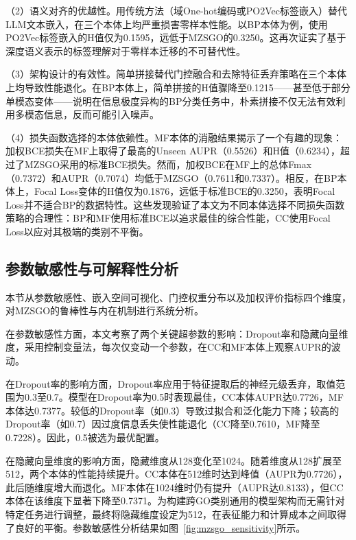 （2）语义对齐的优越性。用传统方法（域One-hot编码或PO2Vec标签嵌入）替代LLM文本嵌入，在三个本体上均严重损害零样本性能。以BP本体为例，使用PO2Vec标签嵌入的H值仅为0.1595，远低于MZSGO的0.3250。这再次证实了基于深度语义表示的标签理解对于零样本迁移的不可替代性。

（3）架构设计的有效性。简单拼接替代门控融合和去除特征丢弃策略在三个本体上均导致性能退化。在BP本体上，简单拼接的H值骤降至0.1215——甚至低于部分单模态变体——说明在信息极度异构的BP分类任务中，朴素拼接不仅无法有效利用多模态信息，反而可能引入噪声。

（4）损失函数选择的本体依赖性。MF本体的消融结果揭示了一个有趣的现象：加权BCE损失在MF上取得了最高的Unseen AUPR（0.5526）和H值（0.6234），超过了MZSGO采用的标准BCE损失。然而，加权BCE在MF上的总体Fmax（0.7372）和AUPR（0.7074）均低于MZSGO（0.7611和0.7337）。相反，在BP本体上，Focal Loss变体的H值仅为0.1876，远低于标准BCE的0.3250，表明Focal Loss并不适合BP的数据特性。这些发现验证了本文为不同本体选择不同损失函数策略的合理性：BP和MF使用标准BCE以追求最佳的综合性能，CC使用Focal Loss以应对其极端的类别不平衡。

\subsection{参数敏感性与可解释性分析}

本节从参数敏感性、嵌入空间可视化、门控权重分布以及加权评价指标四个维度，对MZSGO的鲁棒性与内在机制进行系统分析。

在参数敏感性方面，本文考察了两个关键超参数的影响：Dropout率和隐藏向量维度，采用控制变量法，每次仅变动一个参数，在CC和MF本体上观察AUPR的波动。

在Dropout率的影响方面，Dropout率应用于特征提取后的神经元级丢弃，取值范围为0.3至0.7。模型在Dropout率为0.5时表现最佳，CC本体AUPR达0.7726，MF本体达0.7377。较低的Dropout率（如0.3）导致过拟合和泛化能力下降；较高的Dropout率（如0.7）因过度信息丢失使性能退化（CC降至0.7610，MF降至0.7228）。因此，0.5被选为最优配置。

在隐藏向量维度的影响方面，隐藏维度从128变化至1024。随着维度从128扩展至512，两个本体的性能持续提升。CC本体在512维时达到峰值（AUPR为0.7726），此后随维度增大而退化。MF本体在1024维时仍有提升（AUPR达0.8133），但CC本体在该维度下显著下降至0.7371。为构建跨GO类别通用的模型架构而无需针对特定任务进行调整，最终将隐藏维度设定为512，在表征能力和计算成本之间取得了良好的平衡。参数敏感性分析结果如图~\ref{fig:mzsgo_sensitivity}所示。

